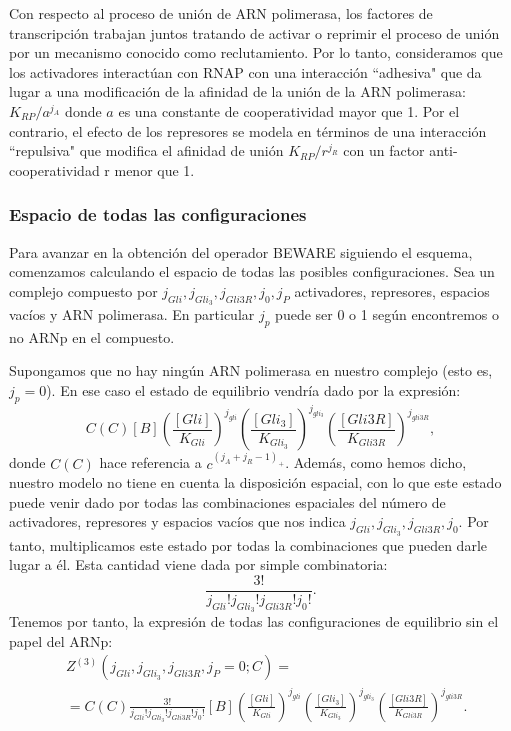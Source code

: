 Con respecto al proceso de unión de ARN polimerasa, los factores de transcripción trabajan juntos tratando de activar o reprimir el proceso de unión por un mecanismo conocido como reclutamiento. Por lo tanto, consideramos que los activadores interactúan con RNAP con una interacción ``adhesiva" que da lugar a una modificación de la afinidad de la unión de la ARN polimerasa: $K_{RP} / a^{j_A}$ donde $a$ es una constante de cooperatividad mayor que 1. Por el contrario, el efecto de los represores se modela en términos de una interacción ``repulsiva" que modifica el afinidad de unión  $K_{RP} / r^{j_R}$ con un factor anti-cooperatividad r menor que 1.

\subsubsection{Espacio de todas las configuraciones}
Para avanzar en la obtención del operador BEWARE siguiendo el esquema, comenzamos calculando el espacio de todas las posibles configuraciones.
Sea un complejo compuesto por $j_{Gli}, j_{Gli_3}, j_{Gli3R}, j_0, j_P$ activadores, represores, espacios vacíos y ARN polimerasa. En particular $j_p$ puede ser 0 o 1 según encontremos o no ARNp en el compuesto.

Supongamos que no hay ningún ARN polimerasa en nuestro complejo (esto es, $j_p=0$). En ese caso el estado de equilibrio vendría dado por la expresión:
\begin{equation}
\textit{C}(C)[B]
\left(\frac{[Gli]}{K_{Gli}}\right)^{j_{gli}}
\left(\frac{[Gli_3]}{K_{Gli_3}}\right)^{j_{gli_3}}
\left(\frac{[Gli3R]}{K_{Gli3R}}\right)^{j_{gli3R}},
\end{equation}
donde $\textit{C}(C)$ hace referencia a $c^{(j_A+j_R-1)_+}$. Además, como hemos dicho, nuestro modelo no tiene en cuenta la disposición espacial, con lo que este estado puede venir dado por todas las combinaciones espaciales del número de activadores, represores y espacios vacíos que nos indica $j_{Gli}, j_{Gli_3}, j_{Gli3R}, j_0$. Por tanto, multiplicamos este estado por todas la combinaciones que pueden darle lugar a él. Esta cantidad viene dada por simple combinatoria: $$\frac{3!}{j_{Gli}! j_{Gli_3}! j_{Gli3R}! j_0!}.$$
Tenemos por tanto, la expresión de todas las configuraciones de equilibrio sin el papel del ARNp:
\begin{equation}
\begin{split}
&Z^{(3)}(j_{Gli}, j_{Gli_3}, j_{Gli3R},j_P=0;C)=\\&=\textit{C}(C)\frac{3!}{j_{Gli}! j_{Gli_3}! j_{Gli3R}!j_0!}[B]
\left(\frac{[Gli]}{K_{Gli}}\right)^{j_{gli}}
\left(\frac{[Gli_3]}{K_{Gli_3}}\right)^{j_{gli_3}}
\left(\frac{[Gli3R]}{K_{Gli3R}}\right)^{j_{gli3R}}.
\end{split}
\end{equation}

